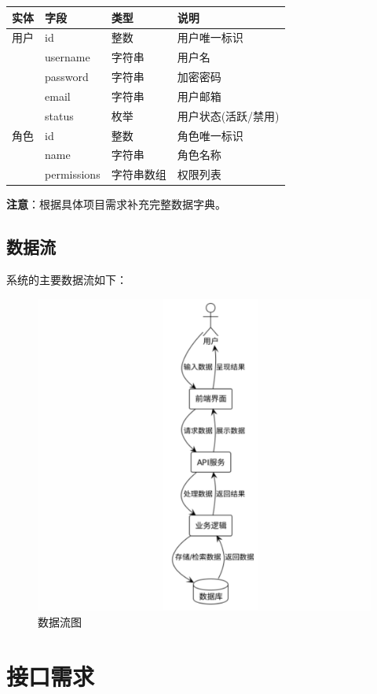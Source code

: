 \documentclass[a4paper,12pt]{article}
\begin{document}
\begin{longtable}{|p{3cm}|p{3cm}|p{3cm}|p{6cm}|}
\hline
\textbf{实体} & \textbf{字段} & \textbf{类型} & \textbf{说明} \\
\hline
\endhead
用户 & id & 整数 & 用户唯一标识 \\
\hline
 & username & 字符串 & 用户名 \\
\hline
 & password & 字符串 & 加密密码 \\
\hline
 & email & 字符串 & 用户邮箱 \\
\hline
 & status & 枚举 & 用户状态(活跃/禁用) \\
\hline
角色 & id & 整数 & 角色唯一标识 \\
\hline
 & name & 字符串 & 角色名称 \\
\hline
 & permissions & 字符串数组 & 权限列表 \\
\hline
\end{longtable}

\textbf{注意}：根据具体项目需求补充完整数据字典。

\subsection{数据流}

系统的主要数据流如下：

\begin{figure}[H]
    \centering
    \includegraphics[width=0.75\linewidth]{assets/6.png}
    \caption{数据流图}
    \label{fig:data-flow}
\end{figure}
\section{接口需求}
\end{document}
